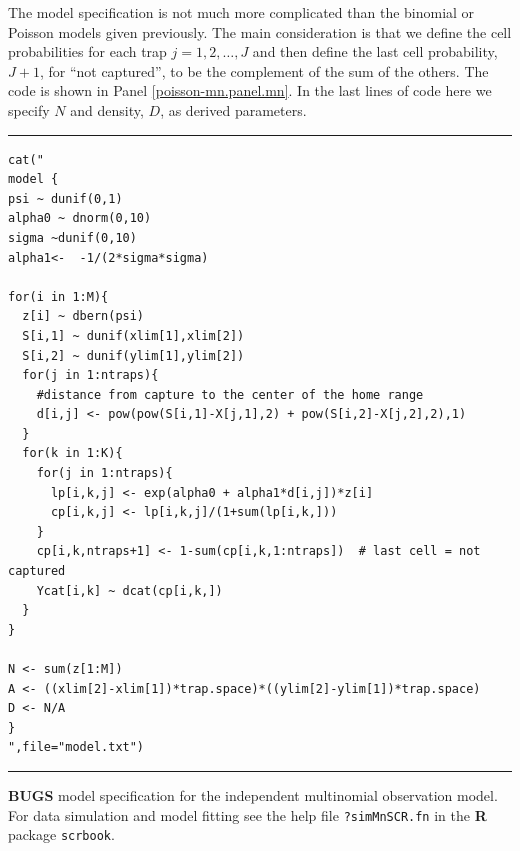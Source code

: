 The model specification is not much more complicated than the binomial
or Poisson models given previously. The main consideration is that we
define the cell probabilities for each trap $j=1,2,\dots,J$ and then
define the last cell probability, $J+1$, for ``not captured'', to be
the complement of the sum of the others. The code is shown in Panel
\ref{poisson-mn.panel.mn}.  In the last lines of code here we specify
$N$ and density, $D$, as derived parameters.

\begin{panel}[htp]
\centering
\rule[0.15in]{\textwidth}{.03in}
{\small
\begin{verbatim}
cat("
model {
psi ~ dunif(0,1)
alpha0 ~ dnorm(0,10)
sigma ~dunif(0,10)
alpha1<-  -1/(2*sigma*sigma)

for(i in 1:M){
  z[i] ~ dbern(psi)
  S[i,1] ~ dunif(xlim[1],xlim[2])
  S[i,2] ~ dunif(ylim[1],ylim[2])
  for(j in 1:ntraps){
    #distance from capture to the center of the home range
    d[i,j] <- pow(pow(S[i,1]-X[j,1],2) + pow(S[i,2]-X[j,2],2),1)
  }
  for(k in 1:K){
    for(j in 1:ntraps){
      lp[i,k,j] <- exp(alpha0 + alpha1*d[i,j])*z[i]
      cp[i,k,j] <- lp[i,k,j]/(1+sum(lp[i,k,]))
    }
    cp[i,k,ntraps+1] <- 1-sum(cp[i,k,1:ntraps])  # last cell = not captured
    Ycat[i,k] ~ dcat(cp[i,k,])
  }
}

N <- sum(z[1:M])
A <- ((xlim[2]-xlim[1])*trap.space)*((ylim[2]-ylim[1])*trap.space)
D <- N/A
}
",file="model.txt")

\end{verbatim}
}
\rule[-0.15in]{\textwidth}{.03in}
\caption{
{\bf BUGS} model specification for the independent multinomial
observation model. For data simulation and model fitting see the
help file \mbox{\tt ?simMnSCR.fn} in the {\bf R} package \mbox{\tt scrbook}.
}
\label{poisson-mn.panel.mn}
\end{panel}


